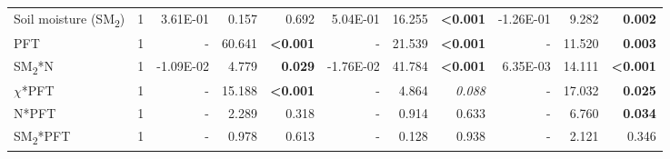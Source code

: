 \begin{landscape}
\begin{table}
{\begin{tabular}{p{3.75cm}p{0.5cm}p{1.75cm}p{1.5cm}p{1.5cm}p{1.75cm}p{1.5cm}p{1.5cm}p{1.75cm}p{1.5cm}p{1.5cm}}
            Soil moisture (SM\textsubscript{2}) & \multicolumn{1}{r}{1}
            & \multicolumn{1}{r}{3.61E-01}      & \multicolumn{1}{r}{0.157}         & \multicolumn{1}{r}{0.692}
            & \multicolumn{1}{r}{5.04E-01}      & \multicolumn{1}{r}{16.255}        & \multicolumn{1}{r}{\textbf{<0.001}}
            & \multicolumn{1}{r}{-1.26E-01}     & \multicolumn{1}{r}{9.282}         & \multicolumn{1}{r}{\textbf{ 0.002}} 
            \\

            PFT & \multicolumn{1}{r}{1}
            & \multicolumn{1}{r}{-}             & \multicolumn{1}{r}{60.641}        & \multicolumn{1}{r}{\textbf{<0.001}}
            & \multicolumn{1}{r}{-}             & \multicolumn{1}{r}{21.539}        & \multicolumn{1}{r}{\textbf{<0.001}}
            & \multicolumn{1}{r}{-}             & \multicolumn{1}{r}{11.520}        & \multicolumn{1}{r}{\textbf{0.003}} 
            \\

            SM\textsubscript{2}*N & \multicolumn{1}{r}{1}
            & \multicolumn{1}{r}{-1.09E-02}     & \multicolumn{1}{r}{4.779}         & \multicolumn{1}{r}{\textbf{ 0.029}}
            & \multicolumn{1}{r}{-1.76E-02}     & \multicolumn{1}{r}{41.784}        & \multicolumn{1}{r}{\textbf{<0.001}}
            & \multicolumn{1}{r}{6.35E-03}      & \multicolumn{1}{r}{14.111}        & \multicolumn{1}{r}{\textbf{<0.001}} 
            \\

            $\chi$*PFT & \multicolumn{1}{r}{1}
            & \multicolumn{1}{r}{-}             & \multicolumn{1}{r}{15.188}        & \multicolumn{1}{r}{\textbf{<0.001}}
            & \multicolumn{1}{r}{-}             & \multicolumn{1}{r}{4.864}         & \multicolumn{1}{r}{\textit{ 0.088}}
            & \multicolumn{1}{r}{-}             & \multicolumn{1}{r}{17.032}        & \multicolumn{1}{r}{\textbf{ 0.025}} 
            \\

            N*PFT & \multicolumn{1}{r}{1}
            & \multicolumn{1}{r}{-}             & \multicolumn{1}{r}{2.289}         & \multicolumn{1}{r}{0.318}
            & \multicolumn{1}{r}{-}             & \multicolumn{1}{r}{0.914}         & \multicolumn{1}{r}{0.633}
            & \multicolumn{1}{r}{-}             & \multicolumn{1}{r}{6.760}         & \multicolumn{1}{r}{\textbf{0.034}}
            \\

            SM\textsubscript{2}*PFT & \multicolumn{1}{r}{1}
            & \multicolumn{1}{r}{-}             & \multicolumn{1}{r}{0.978}         & \multicolumn{1}{r}{0.613}
            & \multicolumn{1}{r}{-}             & \multicolumn{1}{r}{0.128}         & \multicolumn{1}{r}{0.938}
            & \multicolumn{1}{r}{-}             & \multicolumn{1}{r}{2.121}         & \multicolumn{1}{r}{0.346} 
            \\


\end{tabular}}
\end{table}
\end{landscape}
